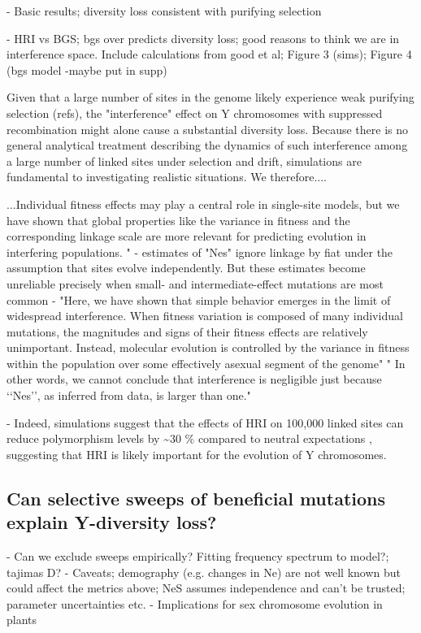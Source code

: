 \documentclass[9pt,twocolumn,twoside]{gsajnl}
\begin{document}
- Basic results; diversity loss consistent with purifying selection

- HRI vs BGS; bgs over predicts diversity loss; good reasons to think we are in interference space. Include calculations from good et al; Figure 3 (sims); Figure 4 (bgs model -maybe put in supp)

Given that a large number of sites in the genome likely experience weak purifying selection (\X refs), the "interference" effect on Y chromosomes with suppressed recombination might alone cause a substantial diversity loss. Because there is no general analytical treatment describing the dynamics of such interference among a large number of linked sites under selection and drift, simulations are fundamental to investigating realistic situations. We therefore....

...Individual fitness effects may play a central role in single-site models, but we have shown that global properties like the variance in fitness and the corresponding linkage scale are more relevant for predicting evolution in interfering populations. " - estimates of "Nes" ignore linkage by fiat under the assumption that sites evolve independently. But these estimates become unreliable precisely when small- and intermediate-effect mutations are most common - "Here, we have shown that simple behavior emerges in the limit of widespread interference. When fitness variation is composed of many individual mutations, the magnitudes and signs of their fitness effects are relatively unimportant. Instead, molecular evolution is controlled by the variance in fitness within the population over some effectively asexual segment of the genome" " In other words, we cannot conclude that interference is negligible just because ‘‘Nes’’, as inferred from data, is larger than one."

- Indeed, simulations suggest that the effects of HRI on 100,000 linked sites can reduce polymorphism levels by \textasciitilde 30 \% compared to neutral expectations \citep{mcvean2000}, suggesting that HRI is likely important for the evolution of Y chromosomes.

\subsection*{Can selective sweeps of beneficial mutations explain Y-diversity loss?}
- Can we exclude sweeps empirically? Fitting frequency spectrum to model?; tajimas D?
- Caveats; demography (e.g. changes in Ne) are not well known but could affect the metrics above; NeS assumes independence and can't be trusted; parameter uncertainties etc.
- Implications for sex chromosome evolution in plants
\end{document}
